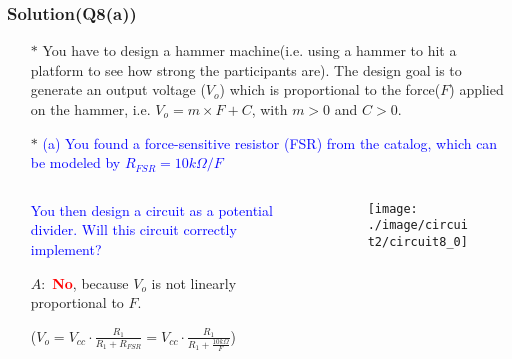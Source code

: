 \documentclass{beamer}
\newcommand{\blue}[1]{\textcolor{blue}{#1}}
\newcommand{\red}[1]{\textcolor{red}{#1}}
\begin{document}

\begin{frame}
\frametitle{Solution(Q8(a))}
\begin{itemize} \itemsep1pt \parskip0pt 
  \item[$\ast$] You have to design a hammer machine(i.e. using a hammer to hit a platform to see how strong the participants are). The design goal is to generate an output voltage ($V_o$) which is proportional to the force($F$) applied on the hammer, i.e. $V_o = m \times F + C$, with $m > 0$ and $C > 0$.
  \item[$\ast$] \blue{(a) You found a force-sensitive resistor (FSR) from the catalog, which can be modeled by $R_{FSR} = 10k\Omega/F$}
\end{itemize}

\begin{columns}

\begin{column}{6.6cm}
\begin{itemize} \itemsep1pt \parskip0pt 
  \item[] \blue{You then design a circuit as a potential divider. Will this circuit correctly implement?}
  \item[$A:$] \red{\bf No}, because $V_o$ is not linearly proportional to $F$.
  \item[] ($V_o = V_{cc} \cdot \frac{R_1}{R_1 + R_{FSR}} = V_{cc} \cdot \frac{R_1}{R_1 + \frac{10k\Omega}{F}}$)
\end{itemize}
\end{column}


\begin{column}{6cm}
\begin{figure}[H]
  \centering
  \texttt{[image: ./image/circuit2/circuit8\_0]}
\end{figure}
\end{column}

\end{columns}

\end{frame}

\end{document}

